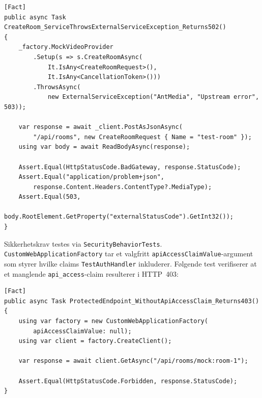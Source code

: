 \begin{lstlisting}[language={[Sharp]C}, caption={RoomsControllerTests — ExternalServiceException mappes til 502}]
[Fact]
public async Task CreateRoom_ServiceThrowsExternalServiceException_Returns502()
{
    _factory.MockVideoProvider
        .Setup(s => s.CreateRoomAsync(
            It.IsAny<CreateRoomRequest>(),
            It.IsAny<CancellationToken>()))
        .ThrowsAsync(
            new ExternalServiceException("AntMedia", "Upstream error", 503));

    var response = await _client.PostAsJsonAsync(
        "/api/rooms", new CreateRoomRequest { Name = "test-room" });
    using var body = await ReadBodyAsync(response);

    Assert.Equal(HttpStatusCode.BadGateway, response.StatusCode);
    Assert.Equal("application/problem+json",
        response.Content.Headers.ContentType?.MediaType);
    Assert.Equal(503,
        body.RootElement.GetProperty("externalStatusCode").GetInt32());
}
\end{lstlisting}

Sikkerhetskrav testes via \texttt{SecurityBehaviorTests}. 
\texttt{CustomWebApplicationFactory} tar et valgfritt 
\texttt{apiAccessClaimValue}-argument som styrer hvilke 
claims \texttt{TestAuthHandler} inkluderer. Følgende test 
verifiserer at et manglende \texttt{api\_access}-claim 
resulterer i HTTP~403:

\begin{lstlisting}[language={[Sharp]C}, caption={SecurityBehaviorTests — manglende api\_access-claim}]
[Fact]
public async Task ProtectedEndpoint_WithoutApiAccessClaim_Returns403()
{
    using var factory = new CustomWebApplicationFactory(
        apiAccessClaimValue: null);
    using var client = factory.CreateClient();

    var response = await client.GetAsync("/api/rooms/mock:room-1");

    Assert.Equal(HttpStatusCode.Forbidden, response.StatusCode);
}
\end{lstlisting}